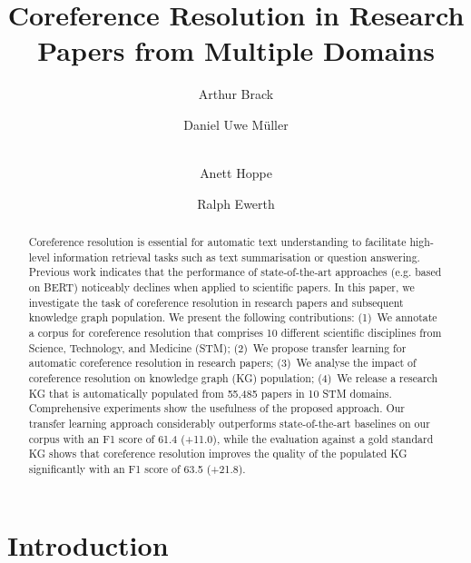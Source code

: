 \documentclass[runningheads]{llncs}
\begin{document}
\title{Coreference Resolution in Research Papers from Multiple Domains}
\author{Arthur Brack
\and Daniel Uwe M\"uller
\and \\ Anett Hoppe
\and Ralph Ewerth}



\maketitle              \begin{abstract}
Coreference resolution is essential for automatic text understanding to facilitate high-level information retrieval tasks such as text summarisation or question answering. Previous work indicates that the performance of state-of-the-art approaches (e.g. based on BERT) noticeably declines when applied to scientific papers. In this paper, we investigate the task of coreference resolution in research papers and subsequent knowledge graph population. We present the following contributions: (1)~We annotate a corpus for coreference resolution that comprises 10 different scientific disciplines from Science, Technology, and Medicine (STM); (2)~We propose transfer learning for automatic coreference resolution in research papers; (3)~We analyse the impact of coreference resolution on knowledge graph (KG) population; (4)~We release a research KG that is automatically populated from 55,485 papers in 10 STM domains. Comprehensive experiments show the usefulness of the proposed approach. Our transfer learning approach considerably outperforms state-of-the-art baselines on our corpus with an F1 score of 61.4 (+11.0), while the evaluation against a gold standard KG shows that coreference resolution improves the quality of the populated KG significantly with an F1 score of 63.5 (+21.8).

\end{abstract}


\section{Introduction}
\label{intro}
\end{document}
